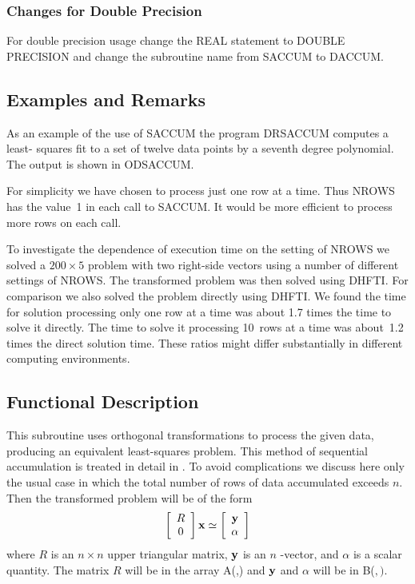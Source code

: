 \documentclass[twoside]{MATH77}
\begin{document}
\subsubsection{Changes for Double Precision}

For double precision usage change the REAL statement to DOUBLE PRECISION and
change the subroutine name from SACCUM to DACCUM.

\subsection{Examples and Remarks}

As an example of the use of SACCUM the program DRSACCUM computes a least-%
squares fit to a set of twelve data points by a seventh degree polynomial.
The output is shown in ODSACCUM.

For simplicity we have chosen to process just one row at a time. Thus NROWS
has the value~1 in each call to SACCUM. It would be more efficient to
process more rows on each call.

To investigate the dependence of execution time on the setting of NROWS we
solved a $200 \times 5$ problem with two right-side vectors using a number
of different settings of NROWS. The transformed problem was then solved
using DHFTI. For comparison we also solved the problem directly using DHFTI.
We found the time for solution processing only one row at a time was about
1.7 times the time to solve it directly. The time to solve it processing
10~rows at a time was about~1.2 times the direct solution time. These ratios
might differ substantially in different computing environments.

\subsection{Functional Description}

This subroutine uses orthogonal transformations to process the given data,
producing an equivalent least-squares problem.  This method of sequential
accumulation is treated in detail in \cite{Lawson:1974:SLS}.  To avoid
complications we discuss here only the usual case in which the total
number of rows of data accumulated exceeds $n$.  Then the transformed
problem will be of the form%
\begin{equation*}
\left[
\begin{array}{c}
R \\
0
\end{array}
\right] {\bf x}\simeq \left[
\begin{array}{c}
{\bf y} \\ \alpha
\end{array}
\right]
\end{equation*}
where $R$ is an $n\times n$ upper triangular matrix, ${\bf y}$ is an $n$%
-vector, and $\alpha $ is a scalar quantity. The matrix $R$ will be in the
array A(,) and ${\bf y}$ and $\alpha $ will be in B($,).$
\end{document}

